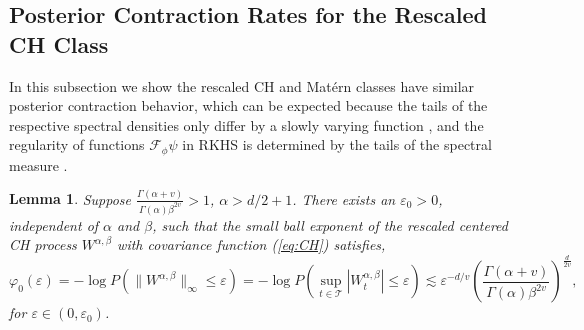 \documentclass[ejs,noshowframe]{imsart}
\theoremstyle{plain}
\newtheorem{lemma}[theorem]{Lemma}
\theoremstyle{definition}
\theoremstyle{remark}
\begin{document}
\subsection{Posterior Contraction Rates for the Rescaled CH Class}\label{section3.3}
In this subsection we show the rescaled CH and Mat\'ern  classes have similar posterior contraction behavior, which can be expected because the tails of the respective spectral densities only differ by a slowly varying function \citep{ma2022beyond}, and  the regularity of functions $\mathcal{F}_{\phi} \psi$ in RKHS is determined by the tails of the spectral measure \citep[][Chapter 11.4.4]{ghosal2017fundamentals}.

\begin{lemma} \label{CH small ball}
 Suppose $\frac{\Gamma(\alpha+v)}{\Gamma(\alpha) \beta^{2v}} >1 $, $\alpha>d/2+1$. There exists an $\varepsilon_0>0$, independent of $\alpha$ and $\beta$, such that 
the small ball exponent of the rescaled centered CH
 process $W^{\alpha,\beta}$  with  covariance function  (\ref{eq:CH}) satisfies,
$$
\varphi_0(\varepsilon) = -\log P(\| W^{\alpha,\beta}\|_{\infty} \le \varepsilon)= - \log P(\sup_{t \in \mathcal{T}} |W_t^{\alpha,\beta}| \le \varepsilon) 
 \lesssim \varepsilon^{-d/v} \left(\frac{\Gamma(\alpha+v)}{\Gamma(\alpha) \beta^{2v}}\right)^{\frac{d}{2v}},
$$
for $\varepsilon \in (0,\varepsilon_0)$.
\end{lemma}
\end{document}
